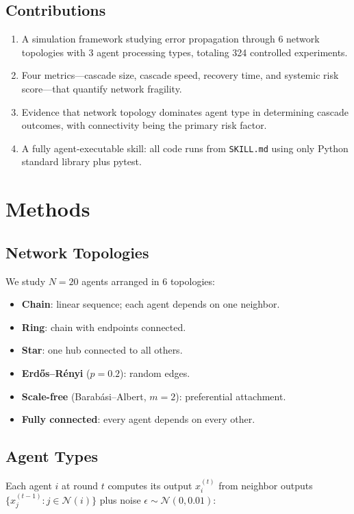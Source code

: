\documentclass[11pt]{article}
\begin{document}
\subsection{Contributions}
\begin{enumerate}
  \item A simulation framework studying error propagation through 6 network topologies with 3 agent processing types, totaling 324 controlled experiments.
  \item Four metrics---cascade size, cascade speed, recovery time, and systemic risk score---that quantify network fragility.
  \item Evidence that network topology dominates agent type in determining cascade outcomes, with connectivity being the primary risk factor.
  \item A fully agent-executable skill: all code runs from \texttt{SKILL.md} using only Python standard library plus pytest.
\end{enumerate}

\section{Methods}

\subsection{Network Topologies}

We study $N = 20$ agents arranged in 6 topologies:
\begin{itemize}
  \item \textbf{Chain}: linear sequence; each agent depends on one neighbor.
  \item \textbf{Ring}: chain with endpoints connected.
  \item \textbf{Star}: one hub connected to all others.
  \item \textbf{Erd\H{o}s--R\'{e}nyi} ($p = 0.2$): random edges.
  \item \textbf{Scale-free} (Barab\'{a}si--Albert, $m = 2$): preferential attachment.
  \item \textbf{Fully connected}: every agent depends on every other.
\end{itemize}

\subsection{Agent Types}

Each agent $i$ at round $t$ computes its output $x_i^{(t)}$ from neighbor outputs $\{x_j^{(t-1)} : j \in \mathcal{N}(i)\}$ plus noise $\epsilon \sim \mathcal{N}(0, 0.01)$:
\end{document}
